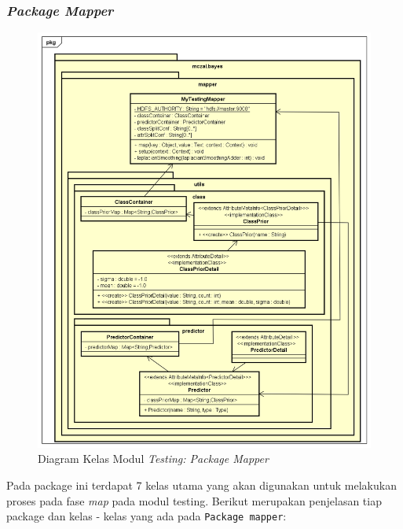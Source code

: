 \subsubsection{\textit{Package Mapper}}
\begin{figure}[H]
	\centering
	\includegraphics[scale=0.6]{ClassDiagramLengkap/CD_Test_Mapper}
	\caption[Diagram Kelas Modul \textit{Testing: Package Mapper}]{Diagram Kelas Modul \textit{Testing: Package Mapper}}
	\label{fig:Diagram Kelas Modul Testing: Package Mapper}
\end{figure}
Pada package ini terdapat 7 kelas utama yang akan digunakan untuk melakukan proses pada fase \textit{map} pada modul testing. Berikut merupakan penjelasan tiap package dan kelas - kelas yang ada pada \texttt{Package mapper}:
